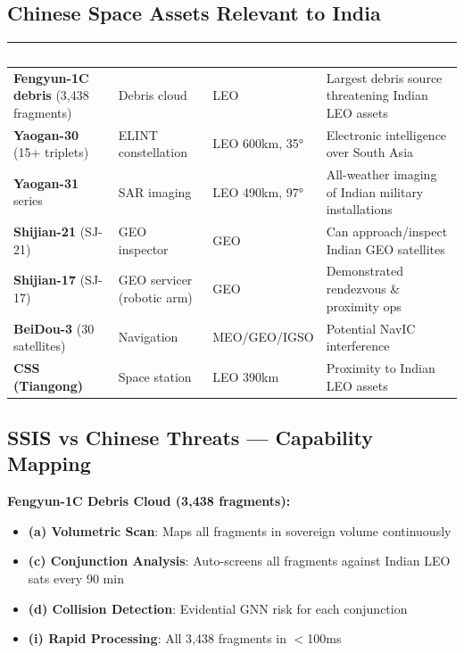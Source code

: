 \documentclass[11pt,a4paper]{article}
\newcommand{\TH}[1]{\textcolor{white}{\textbf{#1}}}
\begin{document}
\subsection{Chinese Space Assets Relevant to India}

\begin{table}[H]\centering\small
\begin{tabularx}{\textwidth}{|p{4cm}|p{2.2cm}|p{2.8cm}|X|}
\hline
\rowcolor{dblue}\TH{Asset} & \TH{Type} & \TH{Orbit} & \TH{Threat to India} \\
\hline
\textbf{Fengyun-1C debris} (3{,}438 fragments) & Debris cloud & LEO & Largest debris source threatening Indian LEO assets \\
\hline
\textbf{Yaogan-30} (15+ triplets) & ELINT constellation & LEO 600km, 35° & Electronic intelligence over South Asia \\
\hline
\textbf{Yaogan-31} series & SAR imaging & LEO 490km, 97° & All-weather imaging of Indian military installations \\
\hline
\textbf{Shijian-21} (SJ-21) & GEO inspector & GEO & Can approach/inspect Indian GEO satellites \\
\hline
\textbf{Shijian-17} (SJ-17) & GEO servicer (robotic arm) & GEO & Demonstrated rendezvous \& proximity ops \\
\hline
\textbf{BeiDou-3} (30 satellites) & Navigation & MEO/GEO/IGSO & Potential NavIC interference \\
\hline
\textbf{CSS (Tiangong)} & Space station & LEO 390km & Proximity to Indian LEO assets \\
\hline
\end{tabularx}
\end{table}

\subsection{SSIS vs Chinese Threats --- Capability Mapping}

\textbf{Fengyun-1C Debris Cloud (3{,}438 fragments):}
\begin{itemize}[noitemsep]
  \item \textbf{(a) Volumetric Scan}: Maps all fragments in sovereign volume continuously
  \item \textbf{(c) Conjunction Analysis}: Auto-screens all fragments against Indian LEO sats every 90 min
  \item \textbf{(d) Collision Detection}: Evidential GNN risk for each conjunction
  \item \textbf{(i) Rapid Processing}: All 3{,}438 fragments in $<$100ms
\end{itemize}
\end{document}
